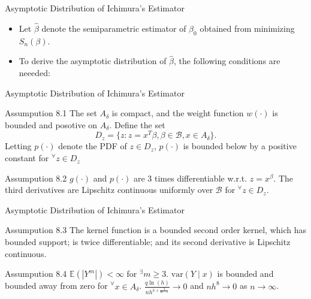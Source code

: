 \documentclass[xcolor=svgnames,dvipdfmx,cjk]{beamer}
\theoremstyle{example}
\def\var{\text{var}}
\def\E{\mathbb{E}}
\begin{document}
\begin{frame}{Asymptotic Distribution of Ichimura's Estimator}
\begin{itemize}
  \item Let $\hat{\beta}$ denote the semiparametric estimator of $\beta_0$
        obtained from minimizing $S_n(\beta)$.
  \item To derive the asymptotic distribution of $\hat{\beta}$, the following conditions are neeeded:
\end{itemize}
\end{frame}


\begin{frame}{Asymptotic Distribution of Ichimura's Estimator}
  \begin{itembox}[l]{Assumpution 8.1}
    The set $A_\delta$ is compact, 
    and the weight function $w(\cdot)$ is bounded and posotive on $A_\delta$.
    Define the set 
    \[D_z = \{ z: z=x^{T}\beta, \beta \in \mathcal{B}, x \in A_\delta \}.\]
    Letting $p(\cdot)$ denote the PDF of $z \in D_z$, 
    $p(\cdot)$ is bounded below by a positive constant for $^\forall z \in D_z$
  \end{itembox}
  \begin{itembox}[l]{Assumpution 8.2}
    $g(\cdot)$ and $p(\cdot)$ are 3 times differentiable w.r.t. $z=x^{\beta}$.
    The third derivatives are Lipschitz continuous uniformly over $\mathcal{B}$
    for $^{\forall} z \in D_z$. 
  \end{itembox}
\end{frame}

\begin{frame}{Asymptotic Distribution of Ichimura's Estimator}
  \begin{itembox}[l]{Assumpution 8.3} 
    The kernel function is a bounded second order kernel, which has bounded support;
    is twice differentiable; 
    and its second derivative is Lipschitz continuous.
  \end{itembox}
  \begin{itembox}[l]{Assumpution 8.4}
    $\E(|Y^m|) < \infty$ for $^{\exists} m \geq 3$.
    $\var(Y \mid x)$ is bounded and 
    bounded away from zero for $^{\forall} x \in A_\delta$. 
    $\frac{q \ln(h)}{nh^{3 + \frac{3}{m-1}}} \to 0$ and 
    $ nh^8 \to 0$ as $n \to \infty$.
  \end{itembox}
\end{frame}
\end{document}
